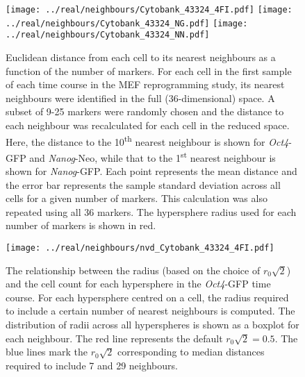 \documentclass{article}
\begin{document}



\newpage

\begin{figure}[p]
    \begin{center}
        \texttt{[image: ../real/neighbours/Cytobank\_43324\_4FI.pdf]}
        \texttt{[image: ../real/neighbours/Cytobank\_43324\_NG.pdf]}
        \texttt{[image: ../real/neighbours/Cytobank\_43324\_NN.pdf]}          
    \end{center}
    \caption{
        Euclidean distance from each cell to its nearest neighbours as a function of the number of markers.
        For each cell in the first sample of each time course in the MEF reprogramming study, its nearest neighbours were identified in the full (36-dimensional) space.
        A subset of 9-25 markers were randomly chosen and the distance to each neighbour was recalculated for each cell in the reduced space.
        Here, the distance to the 10\textsuperscript{th} nearest neighbour is shown for \textit{Oct4}-GFP and \textit{Nanog}-Neo, while that to the 1\textsuperscript{st} nearest neighbour is shown for \textit{Nanog}-GFP.
        Each point represents the mean distance and the error bar represents the sample standard deviation across all cells for a given number of markers.
        This calculation was also repeated using all 36 markers.
        The hypersphere radius used for each number of markers is shown in red.
    }
    \label{fig:radius}
\end{figure}

\begin{figure}[p]
    \begin{center}
        \texttt{[image: ../real/neighbours/nvd\_Cytobank\_43324\_4FI.pdf]}
    \end{center}
    \caption{The relationship between the radius (based on the choice of $r_0\sqrt{2}$) and the cell count for each hypersphere in the \textit{Oct4}-GFP time course.
        For each hypersphere centred on a cell, the radius required to include a certain number of nearest neighbours is computed.
        The distribution of radii across all hyperspheres is shown as a boxplot for each neighbour.
        The red line represents the default $r_0\sqrt{2}=0.5$.
        The blue lines mark the $r_0\sqrt{2}$ corresponding to median distances required to include 7 and 29 neighbours.
    }
    \label{fig:nvd}
\end{figure}
\end{document}
